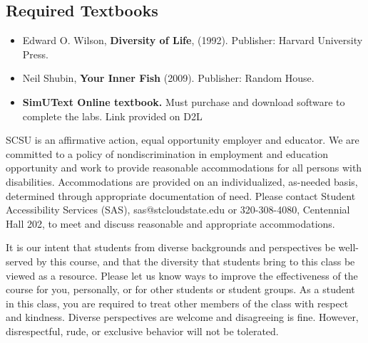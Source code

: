 \documentclass{tufte-handout}
\begin{document}
\begin{fullwidth}
\subsection{Required Textbooks}

\begin{itemize}
	\item Edward O. Wilson, \textbf{Diversity of Life}, (1992). Publisher: Harvard University Press.
	\item Neil Shubin, \textbf{Your Inner Fish} (2009). Publisher: Random House.
	\item \textbf{SimUText Online textbook.} Must purchase and download software to complete the labs. Link provided on D2L
\end{itemize}


\newpage


 SCSU is an affirmative action, equal opportunity employer and educator. We are committed to a policy of nondiscrimination in employment and education opportunity and work to provide reasonable accommodations for all persons with disabilities. Accommodations are provided on an individualized, as-needed basis, determined through appropriate documentation of need. Please contact Student Accessibility Services (SAS), sas@stcloudstate.edu or 320-308-4080, Centennial Hall 202, to meet and discuss reasonable and appropriate accommodations. 

 It is our intent that students from diverse backgrounds and perspectives be well-served by this course, and that the diversity that students bring to this class be viewed as a resource. Please let us know ways to improve the effectiveness of the course for you, personally, or for other students or student groups. As a student in this class, you are required to treat other members of the class with respect and kindness. Diverse perspectives are welcome and disagreeing is fine. However, disrespectful, rude, or exclusive behavior will not be tolerated.




\end{fullwidth}

\end{document}
